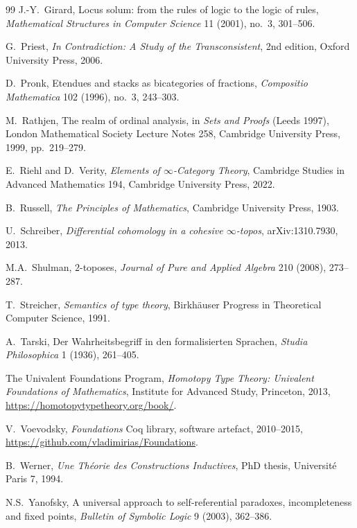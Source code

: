 \documentclass[11pt]{article}
\theoremstyle{plain}
\theoremstyle{definition}
\begin{document}
\begin{thebibliography}{99}
J.-Y.~Girard,
\newblock Locus solum: from the rules of logic to the logic of rules,
\newblock \emph{Mathematical Structures in Computer Science} 11 (2001), no.~3, 301--506.

G.~Priest,
\newblock \emph{In Contradiction: A Study of the Transconsistent},
\newblock 2nd edition, Oxford University Press, 2006.

D.~Pronk,
\newblock Etendues and stacks as bicategories of fractions,
\newblock \emph{Compositio Mathematica} 102 (1996), no.~3, 243--303.

M.~Rathjen,
\newblock The realm of ordinal analysis,
\newblock in \emph{Sets and Proofs} (Leeds 1997), London Mathematical Society Lecture Notes 258, Cambridge University Press, 1999, pp.~219--279.

E.~Riehl and D.~Verity,
\newblock \emph{Elements of $\infty$-Category Theory},
\newblock Cambridge Studies in Advanced Mathematics 194, Cambridge University Press, 2022.

B.~Russell,
\newblock \emph{The Principles of Mathematics},
\newblock Cambridge University Press, 1903.

U.~Schreiber,
\newblock \emph{Differential cohomology in a cohesive $\infty$-topos},
\newblock arXiv:1310.7930, 2013.

M.A.~Shulman,
\newblock $2$-toposes,
\newblock \emph{Journal of Pure and Applied Algebra} 210 (2008), 273--287.

T.~Streicher,
\newblock \emph{Semantics of type theory},
\newblock Birkh\"auser Progress in Theoretical Computer Science, 1991.

A.~Tarski,
\newblock Der Wahrheitsbegriff in den formalisierten Sprachen,
\newblock \emph{Studia Philosophica} 1 (1936), 261--405.

The Univalent Foundations Program,
\newblock \emph{Homotopy Type Theory: Univalent Foundations of Mathematics},
\newblock Institute for Advanced Study, Princeton, 2013,
\newblock \url{https://homotopytypetheory.org/book/}.

V.~Voevodsky,
\newblock \emph{Foundations} Coq library,
\newblock software artefact, 2010--2015,
\newblock \url{https://github.com/vladimirias/Foundations}.

B.~Werner,
\newblock \emph{Une Th\'eorie des Constructions Inductives},
\newblock PhD thesis, Universit\'e Paris 7, 1994.

N.S.~Yanofsky,
\newblock A universal approach to self-referential paradoxes, incompleteness and fixed points,
\newblock \emph{Bulletin of Symbolic Logic} 9 (2003), 362--386.

\end{thebibliography}
\end{document}
